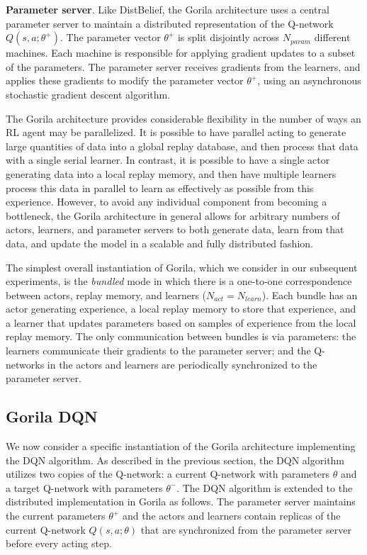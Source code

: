 \documentclass{article}
\begin{document}
{\bf Parameter server}. Like DistBelief, the Gorila architecture uses a central parameter server to maintain a distributed representation of the Q-network $Q(s,a; \theta^+)$. The parameter vector $\theta^+$ is split disjointly across $N_{param}$ different machines. Each machine is responsible for applying gradient updates to a subset of the parameters. The parameter server receives gradients from the learners, and applies these gradients to modify the parameter vector $\theta^+$, using an asynchronous stochastic gradient descent algorithm. 

The Gorila architecture provides considerable flexibility in the number of ways an RL agent may be parallelized. It is possible to have parallel acting to generate large quantities of data into a global replay database, and then process that data with a single serial learner. In contrast, it is possible to have a single actor generating data into a local replay memory, and then have multiple learners process this data in parallel to learn as effectively as possible from this experience. However, to avoid any individual component from becoming a bottleneck, the Gorila architecture in general allows for arbitrary numbers of actors, learners, and parameter servers to both generate data, learn from that data, and update the model in a scalable and fully distributed fashion.

The simplest overall instantiation of Gorila, which we consider in our subsequent experiments, is the \emph{bundled} mode in which there is a one-to-one correspondence between actors, replay memory, and learners ($N_{act} = N_{learn}$). Each bundle has an actor generating experience, a local replay memory to store that experience, and a learner that updates parameters based on samples of experience from the local replay memory. The only communication between bundles is via parameters: the learners communicate their gradients to the parameter server; and the Q-networks in the actors and learners are periodically synchronized to the parameter server.

\subsection{Gorila DQN}

We now consider a specific instantiation of the Gorila architecture implementing the DQN algorithm.
As described in the previous section, the DQN algorithm utilizes two copies of the Q-network: a current Q-network with parameters $\theta$ and a target Q-network with parameters $\theta^-$.
The DQN algorithm is extended to the distributed implementation in Gorila as follows.
The parameter server maintains the current parameters $\theta^+$ and the actors and learners contain replicas of the current Q-network $Q(s,a;\theta)$ that are synchronized from the parameter server before every acting step.
\end{document}
